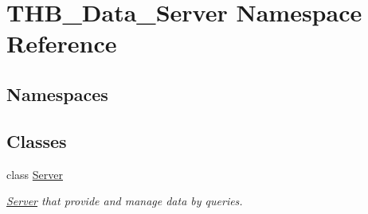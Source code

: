\hypertarget{namespace_t_h_b___data___server}{}\section{T\+H\+B\+\_\+\+Data\+\_\+\+Server Namespace Reference}
\label{namespace_t_h_b___data___server}
\subsection*{Namespaces}
\begin{DoxyCompactItemize}
\end{DoxyCompactItemize}
\subsection*{Classes}
\begin{DoxyCompactItemize}
\item 
class \mbox{\hyperlink{class_t_h_b___data___server_1_1_server}{Server}}
\begin{DoxyCompactList}\small\item\em \mbox{\hyperlink{class_t_h_b___data___server_1_1_server}{Server}} that provide and manage data by queries. \end{DoxyCompactList}\end{DoxyCompactItemize}
